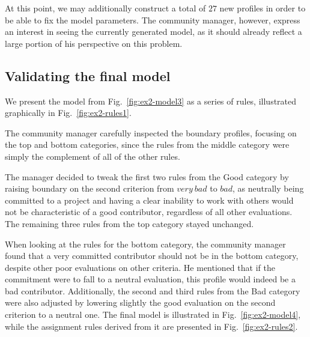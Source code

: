 

At this point, we may additionally construct a total of $27$ new profiles in order to be able to fix the model parameters. The community manager, however, express an interest in seeing the currently generated model, as it should already reflect a large portion of his perspective on this problem.

\subsection{Validating the final model}

We present the model from Fig.~\ref{fig:ex2-model3} as a series of rules, illustrated graphically in Fig.~\ref{fig:ex2-rules1}.



The community manager carefully inspected the boundary profiles, focusing on the top and bottom categories, since the rules from the middle category were simply the complement of all of the other rules.

The manager decided to tweak the first two rules from the Good category by raising boundary on the second criterion from $very\ bad$ to $bad$, as neutrally being committed to a project and having a clear inability to work with others would not be characteristic of a good contributor, regardless of all other evaluations. The remaining three rules from the top category stayed unchanged.

When looking at the rules for the bottom category, the community manager found that a very committed contributor should not be in the bottom category, despite other poor evaluations on other criteria. He mentioned that if the commitment were to fall to a neutral evaluation, this profile would indeed be a bad contributor. Additionally, the second and third rules from the Bad category were also adjusted by lowering slightly the good evaluation on the second criterion to a neutral one. The final model is illustrated in Fig.~\ref{fig:ex2-model4}, while the assignment rules derived from it are presented in Fig.~\ref{fig:ex2-rules2}.



